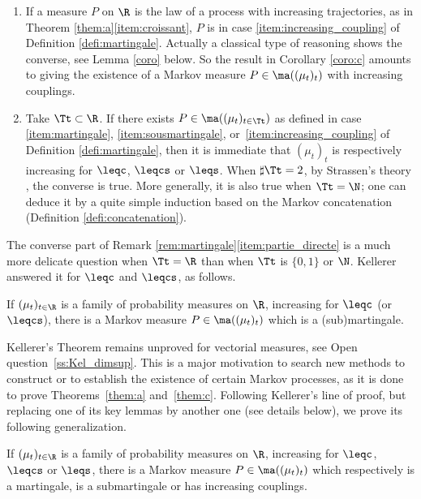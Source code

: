 \skpt
\begin{rem}\label{rem:martingale}
\begin{enumerate}
\item
\label{item:traj_croiss} If a measure $P$ on $\R$ is the law of a process with increasing trajectories, as in Theorem \ref{them:a}\eqref{item:croissant}, $P$ is in case \eqref{item:increasing_coupling} of Definition \ref{defi:martingale}. Actually a classical type of reasoning shows the converse, see Lemma \ref{coro} below. So the result in Corollary \ref{coro:c} amounts to giving the existence of a Markov measure $P\in\ma((\mu_t)_t)$ with increasing couplings.

\item
\label{item:partie_directe} Take $\Tt\subset\R$. If there exists $P\in\ma((\mu_t)_{t\in\Tt})$ as defined in case \eqref{item:martingale}, \eqref{item:sousmartingale}, or~\eqref{item:increasing_coupling} of Definition \ref{defi:martingale}, then it is immediate that $(\mu_t)_t$ is respectively increasing for $\leqc$, $\leqcs$ or $\leqs$. When $\sharp\Tt=2$, by Strassen's theory \cite{St65}, the converse is true. More generally, it is also true when $\Tt=\N$; one can deduce it by a quite simple induction based on the Markov concatenation (Definition \ref{defi:concatenation}).
\end{enumerate}
\end{rem}

The converse part of Remark \ref{rem:martingale}\eqref{item:partie_directe} is a much more delicate question when $\Tt=\R$ than when $\Tt$ is $\{0,1\}$ or $\N$. Kellerer answered it for $\leqc$ and $\leqcs$, as follows.

\begin{them}\label{them:kellerer_intro} If $(\mu_t)_{t\in \R}$ is a family of probability measures on\/ $\R$, increasing for $\leqc$ (or $\leqcs$), there is a Markov measure $P\in\ma((\mu_t)_t)$ which is a (sub)martingale.
\end{them}

Kellerer's Theorem remains unproved for vectorial measures, see Open question~\ref{ss:Kel_dimsup}. This is a major motivation to search new methods to construct or to establish the existence of certain Markov processes, as it is done to prove Theorems~\ref{them:a} and~\ref{them:c}. Following Kellerer's line of proof, but replacing one of its key lemmas by another one (see details below), we prove its following generalization.
\begin{themBJ}\label{them:c}If $(\mu_t)_{t\in \R}$ is a family of probability measures on\/ $\R$, increasing for $\leqc$, $\leqcs$ or $\leqs$, there is a Markov measure $P\in\ma((\mu_t)_t)$ which respectively is a martingale, is a submartingale or has increasing couplings.
\end{themBJ}

